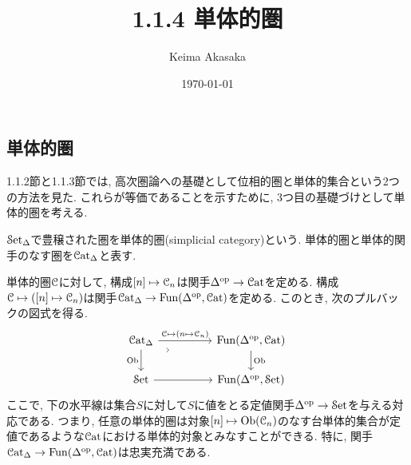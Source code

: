 \documentclass[uplatex, a4paper, 14Q, dvipdfmx]{jsreport}
\title{1.1.4 単体的圏}
\author{Keima Akasaka}
\date{\today}
\begin{document}

\setcounter{chapter}{1}
\setcounter{section}{1} 
\setcounter{subsection}{3}   
\setcounter{subsubsection}{1}

\subsection{単体的圏}

1.1.2節と1.1.3節では, 高次圏論への基礎として位相的圏と単体的集合という2つの方法を見た.
これらが等価であることを示すために, 3つ目の基礎づけとして単体的圏を考える.

\begin{definition}[単体的圏] \label{def.1.1.4.1}
  $\mathcal{S}\mathrm{et}_{\Delta}$で豊穣された圏を単体的圏(simplicial category)という. 
  単体的圏と単体的関手のなす圏を$\mathcal{C}\mathrm{at}_\Delta$と表す. 
\end{definition}

\begin{remark} \label{rem.1.1.4.2} %
  単体的圏$\mathcal{C}$に対して, 構成$[n] \mapsto \mathcal{C}_n$は関手$\Delta^{\mathrm{op}} \to \mathcal{C}\mathrm{at}$を定める. 
  構成$\mathcal{C} \mapsto ([n] \mapsto \mathcal{C}_n)$は関手$\mathcal{C}\mathrm{at}_\Delta \to \mathrm{Fun}(\Delta^{\mathrm{op}}, \mathcal{C}\mathrm{at})$を定める. 
  このとき, 次のプルバックの図式を得る. 
  \[\begin{tikzcd}
    {\Cat_\Delta} && {\Fun(\Delta^\myop,\Cat)} \\
    \Set && {\Fun(\Delta^\myop,\Set)}
    \arrow["\Ob"', from=1-1, to=2-1]
    \arrow["{\C \mapsto (n \mapsto \C_n)}", from=1-1, to=1-3]
    \arrow["\Ob", from=1-3, to=2-3]
    \arrow[from=2-1, to=2-3]
    \arrow["\lrcorner"{anchor=center, pos=0.125, rotate=45}, draw=none, from=1-1, to=2-3]
  \end{tikzcd}\]
  ここで, 下の水平線は集合$S$に対して$S$に値をとる定値関手$\Delta^{\mathrm{op}} \to \mathcal{S}\mathrm{et}$を与える対応である. 
  つまり, 任意の単体的圏は対象$[n] \mapsto \mathrm{Ob}(\mathcal{C}_n)$のなす台単体的集合が定値であるような$\mathcal{C}\mathrm{at}$における単体的対象とみなすことができる. 
  特に, 関手$\mathcal{C}\mathrm{at}_\Delta \to \mathrm{Fun}(\Delta^{\mathrm{op}}, \mathcal{C}\mathrm{at})$は忠実充満である.
\end{remark}
\end{document}
